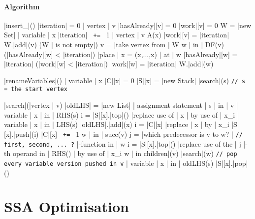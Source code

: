 \documentclass[a4paper,12pt, notitlepage]{article}
\newcommand{\negv}{\vspace{-0.7cm}}
\begin{document}
\paragraph*{Algorithm}
\begin{program}
\PROC |insert_|\Phi() \BODY
    |iteration| = 0
    \FOREACH | vertex | v \DO
        |hasAlready|[v] = 0
        |work|[v] = 0
    \OD
    W = |new Set|
    \FOREACH | variable | x \DO
        |iteration| \texttt{ += } 1
        \FOREACH | vertex | v \in A(x) \DO
            |work|[v] = |iteration|
            W.|add|(v)
        \OD
        \WHILE (W | is not empty|) \DO 
            v = |take vertex from | W
            \FOREACH w | in | DF(v) \DO
                \IF (|hasAlready|[w] < |iteration|) \AR*
                    |place | x = \Phi(x,...,x) | at | w
                    |hasAlready|[w] = |iteration|
                    \IF (|work|[w] < |iteration|) \AR*
                        |work|[w] = |iteration|
                        W.|add|(w)
                    \FI
                \FI
            \OD
        \OD
    \OD
\end{program}
\negv
\begin{program}
\PROC |renameVariables|() \BODY
    \FOREACH | variable | x \DO
        |C|[x] = 0
        |S|[x] = |new Stack|
    \OD
    |search|(s) \hspace{1cm} \texttt{// s = the start vertex}
\end{program}
\pagebreak
\begin{program}
\PROC |search|(|vertex | v) \BODY
    |oldLHS| = |new List|
    \FOREACH | assignment statement | s | in | v \DO
        \FOREACH | variable | x | in | RHS(s) \DO
            i = |S|[x].|top|()
            |replace use of | x | by use of | x_i
        \OD
        \FOREACH | variable | x | in | LHS(s) \DO
            |oldLHS|.|add|(x)
            i = |C|[x]
            |replace | x | by | x_i
            |S|[x].|push|(i)
            |C|[x] \texttt{ += } 1
        \OD
    \OD
    \FOREACH w | in | succ(v) \DO
        j = |which predecessor is v to w? | \hspace{1cm} \texttt{// first, second, ... ?}
        \FOREACH \Phi|-function in | w \DO
            i = |S|[x].|top|()
            |replace use of the | j |-th operand in | RHS(\Phi) | by use of | x_i
        \OD
    \OD
    \FOREACH w | in children|(v) \DO
        |search|(w)
    \texttt{// pop every variable version pushed in v}
    \FOREACH | variable | x | in | oldLHS(s) \DO
        |S|[x].|pop|()
    \OD
\end{program}
\section*{SSA Optimisation}
\end{document}
